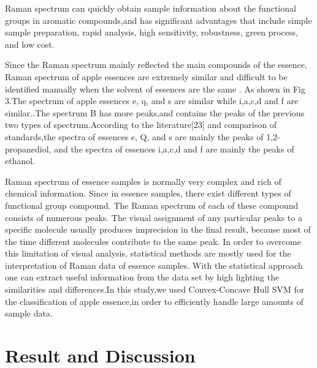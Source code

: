 \documentclass[a4paper]{article}
\begin{document}

Raman spectrum can quickly obtain sample information about the functional groups in aromatic compounds,and has significant advantages that include simple sample preparation, rapid analysis, high sensitivity, robustness, green process, and low cost.

Since the Raman spectrum mainly reflected the main compounds of the essence, Raman spectrum of apple essences are extremely similar and difficult to be identified manually when the solvent of essences are the same
. As shown in Fig 3.The spectrum of apple essences e, q, and s are similar while  i,a,c,d and f are similar..The spectrum B has more peaks,and contains the peaks of the previous two types of spectrum.According to the literature[23] and comparison of standards,the spectra of essences e, Q, and s are mainly the peaks of 1,2-propanediol, and the spectra of essences  i,a,c,d and f are mainly the peaks of ethanol.

Raman  spectrum  of  essence samples  is  normally  very  complex  and  rich  of  chemical information.  Since  in essence  samples,  there  exist  different  types  of  functional group compound. The Raman spectrum of each of these compound consists of  numerous peaks.  The  visual  assignment  of  any  particular  peaks  to  a  specific  molecule usually  produces  imprecision  in  the  final  result,  because  most  of  the  time  different molecules  contribute  to  the  same  peak.  In  order  to  overcome  this  limitation  of  visual analysis, statistical methods are mostly used for the interpretation of Raman data of essence samples. With the statistical approach one can extract useful information from the data set by high  lighting  the  similarities  and differences.In  this  study,we  used Convex-Concave Hull SVM  for  the  classification of  apple essence,in order to efficiently handle large amounts of sample data.
\section{Result and Discussion}
\end{document}
